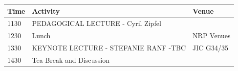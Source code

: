\documentclass[12pt,]{book}
\begin{document}
\begin{longtable}[]{@{}lll@{}}
\toprule
\begin{minipage}[b]{0.09\columnwidth}\raggedright\strut
Time\strut
\end{minipage} & \begin{minipage}[b]{0.35\columnwidth}\raggedright\strut
Activity\strut
\end{minipage} & \begin{minipage}[b]{0.35\columnwidth}\raggedright\strut
Venue\strut
\end{minipage}\tabularnewline
\midrule
\endhead
\begin{minipage}[t]{0.09\columnwidth}\raggedright\strut
1130\strut
\end{minipage} & \begin{minipage}[t]{0.35\columnwidth}\raggedright\strut
PEDAGOGICAL LECTURE - Cyril Zipfel\strut
\end{minipage} & \begin{minipage}[t]{0.35\columnwidth}\raggedright\strut
\strut
\end{minipage}\tabularnewline
\begin{minipage}[t]{0.09\columnwidth}\raggedright\strut
1230\strut
\end{minipage} & \begin{minipage}[t]{0.35\columnwidth}\raggedright\strut
Lunch\strut
\end{minipage} & \begin{minipage}[t]{0.35\columnwidth}\raggedright\strut
NRP Venues\strut
\end{minipage}\tabularnewline
\begin{minipage}[t]{0.09\columnwidth}\raggedright\strut
1330\strut
\end{minipage} & \begin{minipage}[t]{0.35\columnwidth}\raggedright\strut
KEYNOTE LECTURE - STEFANIE RANF -TBC\strut
\end{minipage} & \begin{minipage}[t]{0.35\columnwidth}\raggedright\strut
JIC G34/35\strut
\end{minipage}\tabularnewline
\begin{minipage}[t]{0.09\columnwidth}\raggedright\strut
1430\strut
\end{minipage} & \begin{minipage}[t]{0.35\columnwidth}\raggedright\strut
Tea Break and Discussion\strut
\end{minipage} & \begin{minipage}[t]{0.35\columnwidth}\raggedright\strut

\end{minipage}
\end{longtable}
\end{document}

